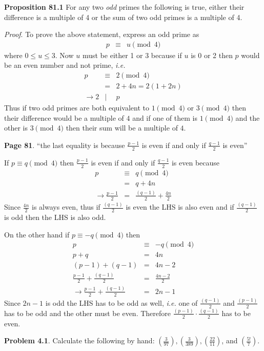 \documentclass[aps,preprint,preprintnumbers,nofootinbib,showpacs,prd]{revtex4-1}
\newcommand{\ie}{{\it i.e.} }
\newcommand{\nbea}{\begin{eqnarray*}}
\newcommand{\neea}{\end{eqnarray*}}
\begin{document}
{\bf Proposition 81.1} For any two {\it odd} primes the following is true, either their difference is a multiple of 4 or the sum of two odd primes is a multiple of 4. 

{\it Proof}. To prove the above statement, express an odd prime as
%
\nbea
p & \equiv & u \pmod{4}
\neea
%
where $0 \le u \le 3$. Now $u$ must be either 1 or 3 because if $u$ is 0 or 2 then $p$ would be an even number and not prime, \ie
%
\nbea
p & \equiv & 2 \pmod{4} \\
& = & 2 + 4n = 2 (1 + 2n) \\
\to 2 & | & p
\neea
%
Thus if two odd primes are both equivalent to $1 \pmod{4}$ or $3 \pmod{4}$ then their difference would be a multiple of $4$ and if one of them is $1 \pmod{4}$ and the other is $3 \pmod{4}$ then their sum will be a multiple of $4$.

{\bf Page 81}. ``the last equality is because $\frac{p-1}{2}$ is even if and only if $\frac{q-1}{2}$ is even''

If $p \equiv q \pmod{4}$ then $\frac{p-1}{2}$ is even if and only if $\frac{q-1}{2}$ is even because
%
\nbea
p & \equiv & q \pmod{4} \\
& = & q + 4n \\
\to \frac{p - 1}{2} & = & \frac{(q-1)}{2} + \frac{4n}{2}
\neea
%
Since $\frac{4n}{2}$ is always even, thus if $\frac{(q-1)}{2}$ is even the LHS is also even and if $\frac{(q-1)}{2}$ is odd then the LHS is also odd.

On the other hand if $p \equiv -q \pmod{4}$ then 
%
\nbea
p & \equiv & -q \pmod{4} \\
p + q & = & 4n \\
(p - 1) + (q - 1) & = & 4n - 2 \\
\frac{p - 1}{2} + \frac{(q-1)}{2} & = & \frac{4n - 2}{2} \\
\to \frac{p - 1}{2} + \frac{(q-1)}{2} & = & 2n - 1
\neea
%
Since $2n - 1$ is odd the LHS has to be odd as well, \ie one of $\frac{(q-1)}{2}$ and $\frac{(p-1)}{2}$ has to be odd and the other must be even. Therefore $\frac{(p-1)}{2} \cdot \frac{(q-1)}{2}$ has to be even. 

{\bf Problem 4.1}. Calculate the following by hand: $\left ( \frac{3}{97} \right ), \left ( \frac{3}{389} \right ), \left ( \frac{22}{11} \right )$, and $\left ( \frac{5!}{7} \right )$.
\end{document}
